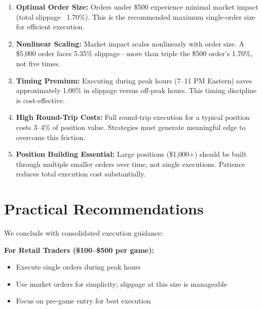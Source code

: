 \begin{keyfindings}
\begin{enumerate}
    \item \textbf{Optimal Order Size:} Orders under \$500 experience minimal market impact (total slippage ~1.70\%). This is the recommended maximum single-order size for efficient execution.

    \item \textbf{Nonlinear Scaling:} Market impact scales nonlinearly with order size. A \$5,000 order faces 5.35\% slippage---more than triple the \$500 order's 1.70\%, not five times.

    \item \textbf{Timing Premium:} Executing during peak hours (7--11 PM Eastern) saves approximately 1.00\% in slippage versus off-peak hours. This timing discipline is cost-effective.

    \item \textbf{High Round-Trip Costs:} Full round-trip execution for a typical position costs 3--4\% of position value. Strategies must generate meaningful edge to overcome this friction.

    \item \textbf{Position Building Essential:} Large positions (\$1,000+) should be built through multiple smaller orders over time, not single executions. Patience reduces total execution cost substantially.
\end{enumerate}
\end{keyfindings}

\section{Practical Recommendations}

We conclude with consolidated execution guidance:

\textbf{For Retail Traders (\$100--\$500 per game):}
\begin{itemize}
    \item Execute single orders during peak hours
    \item Use market orders for simplicity; slippage at this size is manageable
    \item Focus on pre-game entry for best execution
\end{itemize}


